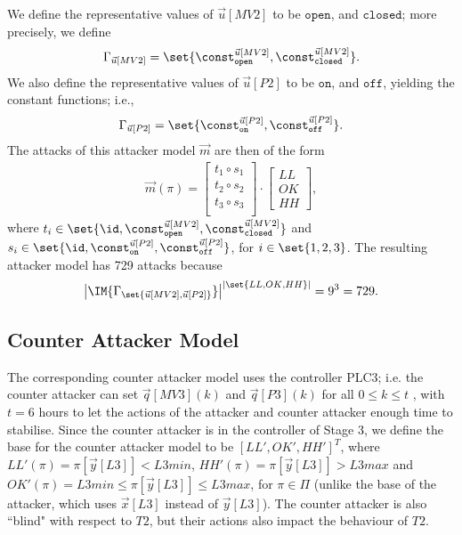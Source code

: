 {We define the representative values of $\vec{u}[MV2]$ to be $\texttt{open}$, and $\texttt{closed}$; more precisely, we define
\begin{align*}
  \Gamma_{\vec{u}[MV2]}=\set{\const^{\vec{u}[MV2]}_{\texttt{open}}, \const^{\vec{u}[MV2]}_{\texttt{closed}}}.
\end{align*}
We also define the representative values of $\vec{u}[P2]$ to be $\texttt{on}$, and $\texttt{off}$, yielding the constant functions; i.e., 
\begin{align*}
  \Gamma_{\vec{u}[P2]}=\set{\const^{\vec{u}[P2]}_{\texttt{on}}, \const^{\vec{u}[P2]}_{\texttt{off}}}.
\end{align*}
The attacks of this attacker model $\vec{m}$ are then of the form
\begin{align*}
  \vec{m}(\pi)=
  \begin{bmatrix}
    t_1\circ s_1 \\
    t_2\circ s_2 \\
    t_3\circ s_3 \\
  \end{bmatrix}
  \cdot
  \begin{bmatrix}
    LL \\
    OK \\
    HH
  \end{bmatrix},
\end{align*} 
where $t_i\in \set{\id,\const^{\vec{u}[MV2]}_{\texttt{open}}, \const^{\vec{u}[MV2]}_{\texttt{closed}}}$ and  $s_i\in\set{\id,\const^{\vec{u}[P2]}_{\texttt{on}}, \const^{\vec{u}[P2]}_{\texttt{off}}}$, for $i\in \set{1,2,3}$. The resulting attacker model has 729 attacks because
 \begin{align*}
  \left| \IM{\Gamma_{\set{\vec{u}[MV2],\vec{u}[P2]}}}\right|^{\left|\set{{LL},{OK},{HH}}\right|}=9^3=729.
\end{align*}

\subsection{Counter Attacker Model}
The corresponding counter attacker model uses the controller PLC3; i.e. the counter attacker can set $\vec{q}[MV3](k)$ and $\vec{q}[P3](k)$ for all $0\leq k\leq t$ , with  $t=6$ hours to let the actions of the attacker and counter attacker enough time to stabilise. Since the counter attacker is in the controller of Stage 3, we define the base for the counter attacker model to be $[LL', OK', HH']^T$, where ${LL'}(\pi)=\pi[\vec{y}[L3]]<L3min$, ${HH'}(\pi)=\pi[\vec{y}[L3]]>L3max$ and ${OK'}(\pi)=L3min \leq \pi[\vec{y}[L3]]\leq L3max$, for $\pi \in \Pi$ (unlike the base of the attacker, which uses $\vec{x}[L3]$ instead of $\vec{y}[L3]$). The counter attacker is also ``blind" with respect to $T2$, but their actions also impact the behaviour of $T2$. 

}
